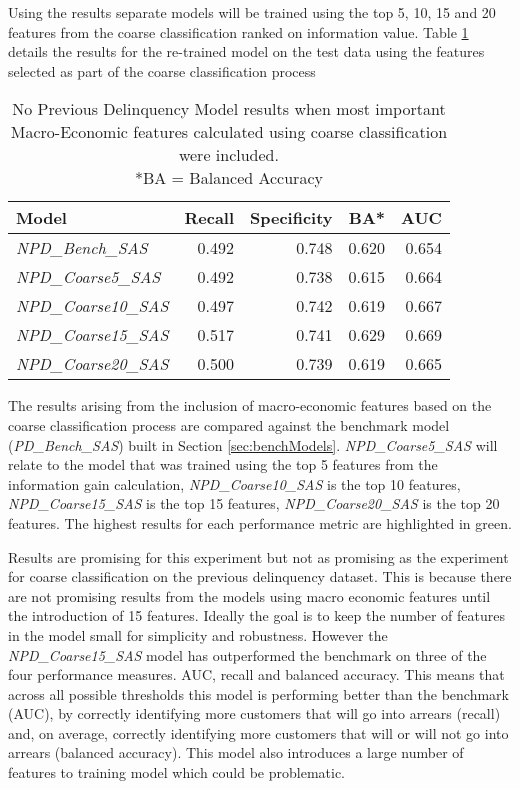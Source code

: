 Using the results separate models will be trained using the top 5, 10, 15 and 20 features from
the coarse classification ranked on information value. Table \ref{table:CoarseNPDModelResults} details the results for the re-trained model
on the test data using the features selected as part of the coarse classification process

\begin{table}[H]
	\centering
	\small
	\begin{tabular}{l r r r r}
		\hline
		\textbf{Model} & \textbf{Recall} & \textbf{Specificity} & \textbf{BA*} & \textbf{AUC}  \\ \hline
		\textit{NPD\_Bench\_SAS} & 0.492 & \cellcolor{green!25}0.748 & 0.620 & 0.654 \\ \hline
		\textit{NPD\_Coarse5\_SAS}  & 0.492 & 0.738 & 0.615 & 0.664   \\ 
		\textit{NPD\_Coarse10\_SAS} & 0.497 & 0.742 & 0.619 & 0.667  \\ 
		\textit{NPD\_Coarse15\_SAS} & \cellcolor{green!25}0.517 & 0.741 & \cellcolor{green!25}0.629 & \cellcolor{green!25}0.669  \\
		\textit{NPD\_Coarse20\_SAS} & 0.500 & 0.739 & 0.619 & 0.665  \\\hline 
	\end{tabular}
	\caption{{No Previous Delinquency Model results when most important\\
			Macro-Economic features calculated using coarse classification were included.
			\\ *BA = Balanced Accuracy}}
	\label{table:CoarseNPDModelResults}
\end{table}
The results arising from the inclusion of macro-economic features based on the coarse classification process are compared against the benchmark model (\textit{PD\_Bench\_SAS}) built in Section \ref{sec:benchModels}. \textit{NPD\_Coarse5\_SAS} will relate to the model that was trained using the top 5 features from the information gain calculation, \textit{NPD\_Coarse10\_SAS} is the top 10 features, \textit{NPD\_Coarse15\_SAS} is the top 15 features, \textit{NPD\_Coarse20\_SAS} is the top 20 features. The highest results for each performance metric are highlighted in green.

Results are promising for this experiment but not as promising as the experiment for coarse classification on the previous delinquency dataset. This is because there are not promising results from the models using macro economic features until the introduction of 15 features. Ideally the goal is to keep the number of features in the model small for simplicity and robustness. However the \textit{NPD\_Coarse15\_SAS} model has outperformed the benchmark on three of the four performance measures. AUC, recall and balanced accuracy. This means that across all possible thresholds this model is performing better than the benchmark (AUC), by correctly identifying more customers that will go into arrears (recall) and, on average, correctly identifying more customers that will or will not go into arrears (balanced accuracy). This model also introduces a large number of features to training model which could be problematic. 

